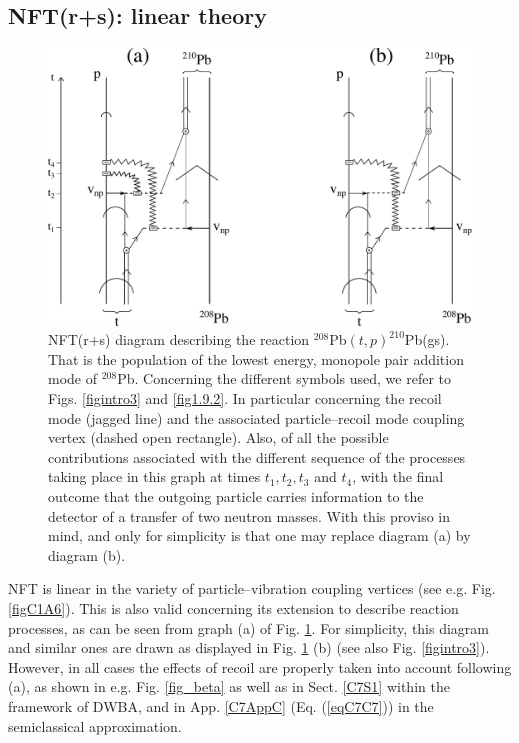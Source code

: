 \begin{subappendices}
\subsection{NFT(r+s): linear theory}\label{App1C3}
\begin{figure}
\centerline {
\includegraphics*[width=15cm]{introduccion/figs/fig1_C_2}
}
\caption{NFT(r+s) diagram describing the reaction $^{208}$Pb$(t,p)^{210}$Pb(gs). That is the population of the lowest energy, monopole pair addition mode of $^{208}$Pb. Concerning the different symbols used, we refer to Figs. \ref{figintro3} and \ref{fig1.9.2}. In particular concerning the recoil mode (jagged line) and the associated particle--recoil mode coupling vertex (dashed open rectangle). Also, of all the possible contributions associated with the different sequence of the processes taking place in this graph at times $t_1,t_2,t_3$ and $t_4$, with the final outcome that the outgoing particle carries information to the detector of a transfer of two neutron masses. With this proviso in mind, and only for simplicity is that one may replace diagram (a) by diagram (b).}
\label{fig1.C.2}
\end{figure}
NFT is linear in the variety of particle--vibration coupling vertices (see e.g. Fig. \ref{figC1A6}).  This is also valid concerning its extension to describe reaction processes, as can be seen from graph (a) of Fig. \ref{fig1.C.2}. For simplicity, this diagram and similar ones are drawn as displayed in Fig. \ref{fig1.C.2} (b) (see also Fig. \ref{figintro3}). However, in all cases the effects of recoil are properly taken into account following (a), as shown in e.g. Fig. \ref{fig_beta} as well as in Sect. \ref{C7S1} within the framework of DWBA, and in App. \ref{C7AppC} (Eq. (\ref{eqC7C7})) in the semiclassical approximation.

\end{subappendices}
